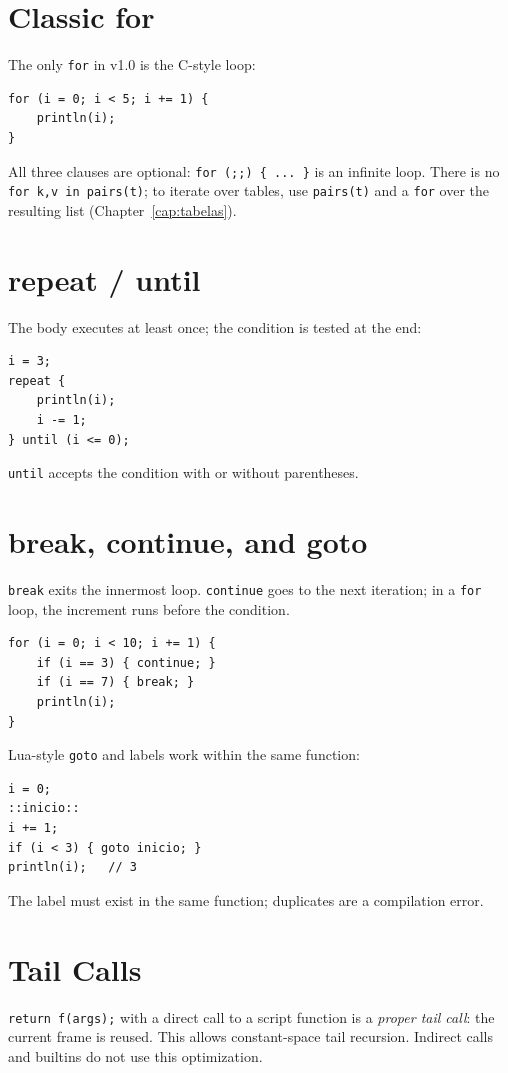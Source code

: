 \documentclass[11pt,a4paper,oneside]{report}
\newcommand{\code}[1]{\texttt{#1}}
\begin{document}
\section{Classic for}
The only \code{for} in v1.0 is the C-style loop:

\begin{lstlisting}
for (i = 0; i < 5; i += 1) {
    println(i);
}
\end{lstlisting}

All three clauses are optional: \code{for (;;) \{ ... \}} is an infinite
loop. There is no \code{for k,v in pairs(t)}; to iterate over tables, use
\code{pairs(t)} and a \code{for} over the resulting list
(Chapter~\ref{cap:tabelas}).

\section{repeat / until}
The body executes at least once; the condition is tested at the end:

\begin{lstlisting}
i = 3;
repeat {
    println(i);
    i -= 1;
} until (i <= 0);
\end{lstlisting}

\code{until} accepts the condition with or without parentheses.

\section{break, continue, and goto}
\code{break} exits the innermost loop. \code{continue} goes to the next
iteration; in a \code{for} loop, the increment runs before the condition.

\begin{lstlisting}
for (i = 0; i < 10; i += 1) {
    if (i == 3) { continue; }
    if (i == 7) { break; }
    println(i);
}
\end{lstlisting}

Lua-style \code{goto} and labels work within the same function:

\begin{lstlisting}
i = 0;
::inicio::
i += 1;
if (i < 3) { goto inicio; }
println(i);   // 3
\end{lstlisting}

The label must exist in the same function; duplicates are a compilation
error.

\section{Tail Calls}
\code{return f(args);} with a direct call to a script function is a
\emph{proper tail call}: the current frame is reused. This allows
constant-space tail recursion. Indirect calls and builtins do not use this
optimization.
\end{document}
